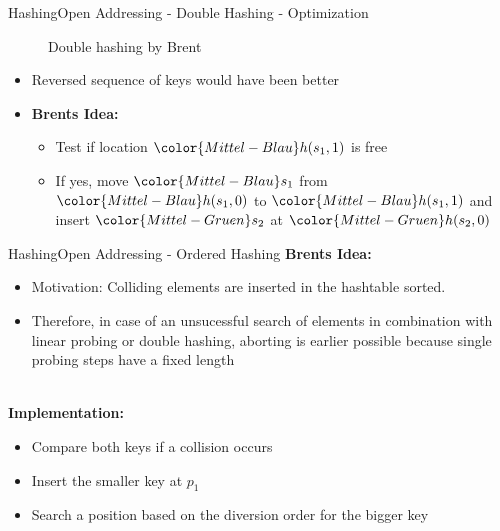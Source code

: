 
\begin{frame}{Hashing}{Open Addressing - Double Hashing - Optimization}
  \vspace{-2.0em}
  \begin{figure}[!h]
    \begin{adjustbox}{width=0.9\linewidth}%
    \end{adjustbox}
    \vspace{-1.0em}
    \caption{Double hashing by Brent}%
    \label{fig:hashing:open_addressing:double_hashing_brent}%
  \end{figure}
  \vspace{-1.0em}
  \begin{itemize}
  \item<2->
    Reversed sequence of keys would have been better
  \item<3->
    \textbf{Brents Idea:}
    \begin{itemize}
    \item<4->
      Test if location ${\color{Mittel-Blau}h(s_1, 1)}$ is free
    \item<5->
      If yes, move ${\color{Mittel-Blau}s_1}$ from
      ${\color{Mittel-Blau}h(s_1, 0)}$ to ${\color{Mittel-Blau}h(s_1, 1)}$
      and insert ${\color{Mittel-Gruen}s_2}$ at
      ${\color{Mittel-Gruen}h(s_2, 0)}$
    \end{itemize}
  \end{itemize}  
\end{frame}


\begin{frame}{Hashing}{Open Addressing - Ordered Hashing}
  \textbf{Brents Idea:}
  \begin{itemize}
    \item Motivation:
      Colliding elements are inserted in the hashtable sorted. 
    \item
      Therefore, in case of an unsucessful search of elements
      in combination with linear probing or double hashing,
      aborting is earlier possible because single probing steps
      have a fixed length
  \end{itemize}
  \hfill\\[0.5em]
  \textbf{Implementation:}
  \begin{itemize}
    \item
      Compare both keys if a collision occurs
    \item
      Insert the smaller key at $p_1$
    \item
      Search a position based on the diversion order for the bigger key
  \end{itemize}
\end{frame}

